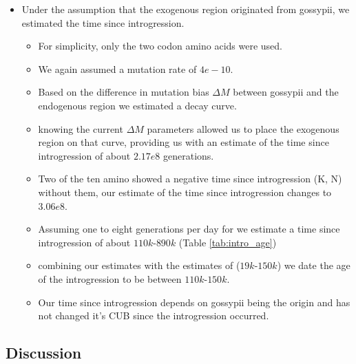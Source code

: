 \documentclass[12pt]{article}
\begin{document}
\begin{itemize}
\begin{itemize}
\begin{itemize}
		\end{itemize}	 
	\end{itemize}
	\item Under the assumption that the exogenous region originated from gossypii, we estimated the time since introgression.
	\begin{itemize}
		\item For simplicity, only the two codon amino acids were used. 
		\item We again assumed a mutation rate of $4e-10$.
		\item Based on the difference in mutation bias $\Delta M$ between gossypii and the endogenous region we estimated a decay curve.
		\item knowing the current $\Delta M$ parameters allowed us to place the exogenous region on that curve, providing us with an estimate of the time since introgression of about $2.17e8$ generations.
		\item Two of the ten amino showed a negative time since introgression (K, N) without them, our estimate of the time since introgression changes to $3.06e8$.
		\item Assuming one to eight generations per day for \kluyveri we estimate a time since introgression of about $110k$-$890k$ (Table \ref{tab:intro_age})
		\item combining our estimates with the estimates of \citep{friedrich2015} ($19k$-$150k$) we date the age of the introgression to be between $110k$-$150k$.
		\item Our time since introgression depends on gossypii being the origin and has not changed it's CUB since the introgression occurred.
	\end{itemize}
\end{itemize}


\subsection*{Discussion}
\end{document}
